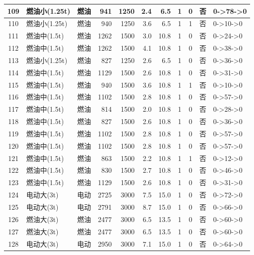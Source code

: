 \begin{landscape}
\begin{longtable}{|c|l|c|r|r|r|r|c|c|c|p{2.8cm}|}
\hline
\rowcolor{gray!8}
109 & 燃油小(1.25t) & 燃油 & 941 & 1250 & 2.4 & 6.5 & 1 & 0 & 否 & 0->78->0 \\
\hline
110 & 燃油小(1.25t) & 燃油 & 940 & 1250 & 3.6 & 6.5 & 1 & 1 & 否 & 0->10->0 \\
\hline
\rowcolor{gray!8}
111 & 燃油中(1.5t) & 燃油 & 1262 & 1500 & 3.0 & 10.8 & 1 & 0 & 否 & 0->24->0 \\
\hline
112 & 燃油中(1.5t) & 燃油 & 1262 & 1500 & 4.1 & 10.8 & 1 & 0 & 否 & 0->38->0 \\
\hline
\rowcolor{gray!8}
113 & 燃油小(1.25t) & 燃油 & 827 & 1250 & 2.6 & 6.5 & 1 & 0 & 否 & 0->36->0 \\
\hline
114 & 燃油中(1.5t) & 燃油 & 1129 & 1500 & 2.6 & 10.8 & 1 & 0 & 否 & 0->31->0 \\
\hline
\rowcolor{gray!8}
115 & 燃油中(1.5t) & 燃油 & 940 & 1500 & 3.6 & 10.8 & 1 & 1 & 否 & 0->10->0 \\
\hline
116 & 燃油中(1.5t) & 燃油 & 1102 & 1500 & 2.8 & 10.8 & 1 & 0 & 否 & 0->57->0 \\
\hline
\rowcolor{gray!8}
117 & 燃油中(1.5t) & 燃油 & 814 & 1500 & 2.0 & 10.8 & 1 & 0 & 否 & 0->28->0 \\
\hline
118 & 燃油中(1.5t) & 燃油 & 827 & 1500 & 2.6 & 10.8 & 1 & 0 & 否 & 0->36->0 \\
\hline
\rowcolor{gray!8}
119 & 燃油中(1.5t) & 燃油 & 1102 & 1500 & 2.8 & 10.8 & 1 & 0 & 否 & 0->57->0 \\
\hline
120 & 燃油中(1.5t) & 燃油 & 1102 & 1500 & 2.8 & 10.8 & 1 & 0 & 否 & 0->57->0 \\
\hline
\rowcolor{gray!8}
121 & 燃油中(1.5t) & 燃油 & 863 & 1500 & 2.2 & 10.8 & 1 & 1 & 否 & 0->12->0 \\
\hline
122 & 燃油中(1.5t) & 燃油 & 830 & 1500 & 2.7 & 10.8 & 1 & 0 & 否 & 0->46->0 \\
\hline
\rowcolor{gray!8}
123 & 燃油中(1.5t) & 燃油 & 1129 & 1500 & 2.6 & 10.8 & 1 & 0 & 否 & 0->31->0 \\
\hline
124 & 电动大(3t) & 电动 & 2725 & 3000 & 7.5 & 15.0 & 1 & 0 & 否 & 0->72->0 \\
\hline
\rowcolor{gray!8}
125 & 电动大(3t) & 电动 & 2791 & 3000 & 8.7 & 15.0 & 1 & 0 & 否 & 0->66->0 \\
\hline
126 & 燃油大(3t) & 燃油 & 2477 & 3000 & 6.5 & 13.5 & 1 & 0 & 否 & 0->60->0 \\
\hline
\rowcolor{gray!8}
127 & 燃油大(3t) & 燃油 & 2477 & 3000 & 6.5 & 13.5 & 1 & 0 & 否 & 0->60->0 \\
\hline
128 & 电动大(3t) & 电动 & 2950 & 3000 & 7.1 & 15.0 & 1 & 0 & 否 & 0->64->0 \\

\end{longtable}
\end{landscape}
